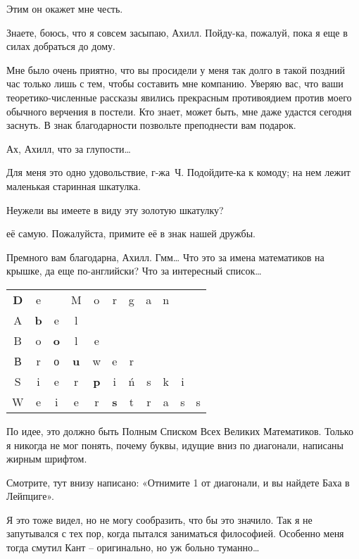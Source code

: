 \documentclass[../main.tex]{subfiles}
\begin{document}
\begin{dialogue}
 Этим он окажет мне честь.

 Знаете, боюсь, что я совсем засыпаю, Ахилл. Пойду-ка, пожалуй, пока я еще в силах добраться до дому.

 Мне было очень приятно, что вы просидели у меня так долго в такой поздний час только лишь с тем, чтобы составить мне компанию. Уверяю вас, что ваши теоретико-численные рассказы явились прекрасным противоядием против моего обычного верчения в постели. Кто знает, может быть, мне даже удастся сегодня заснуть. В знак благодарности позвольте преподнести вам подарок.

 Ах, Ахилл, что за глупости\ldots{}

 Для меня это одно удовольствие, г-жа~Ч. Подойдите-ка к комоду; на нем лежит маленькая старинная шкатулка.


 Неужели вы имеете в виду эту золотую шкатулку?

 её самую. Пожалуйста, примите её в знак нашей дружбы.

 Премного вам благодарна, Ахилл. Гмм\ldots{} Что это за имена математиков на крышке, да еще по-английски? Что за интересный список\ldots{}

\begingroup
\setlength{\tabcolsep}{2pt}
\hfil
\begin{tabular}{ccccccccccc}
\textbf{D} & e & ~ & M & o & r & g & a & n \\
A & \textbf{b} & e & l \\
B & o & \textbf{o} & l & e \\
В  & r & о & \textbf{u} & w & e & r \\
S & i & e & r & \textbf{p} & i & \'{n} & s & k & i \\
W & e & i & e & r & \textbf{s} & t & r & a & s & s
\end{tabular}
\hfil
\endgroup

 По идее, это должно быть Полным Списком Всех Великих Математиков. Только я никогда не мог понять, почему буквы, идущие вниз по диагонали, написаны жирным шрифтом.

 Смотрите, тут внизу написано: «Отнимите 1 от диагонали, и вы найдете Баха в Лейпциге».

 Я это тоже видел, но не могу сообразить, что бы это значило. Так я не запутывался с тех пор, когда пытался заниматься философией. Особенно меня тогда смутил Кант \--- оригинально, но уж больно туманно\ldots{}


\end{dialogue}
\end{document}
